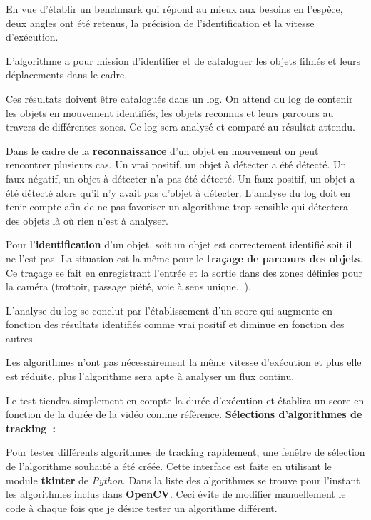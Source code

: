    En vue d'établir un benchmark qui répond au mieux aux besoins en l'espèce, deux angles ont été retenus, la précision de l'identification et la vitesse d'exécution.

    L'algorithme a pour mission d'identifier et de cataloguer les objets filmés et leurs déplacements dans le cadre.

Ces résultats doivent être catalogués dans un log. On attend du log de contenir les objets en mouvement identifiés, les objets reconnus et leurs parcours au travers de différentes zones. Ce log sera analysé et comparé au résultat attendu.

Dans le cadre de la \textbf{reconnaissance} d'un objet en mouvement on peut rencontrer plusieurs cas. Un vrai positif, un objet à détecter a été détecté. Un faux négatif, un objet à détecter n'a pas été détecté. Un faux positif, un objet a été détecté alors qu'il n'y avait pas d'objet à détecter. L'analyse du log doit en tenir compte afin de ne pas favoriser un algorithme trop sensible qui détectera des objets là où rien n'est à analyser.

Pour l'\textbf{identification} d'un objet, soit un objet est correctement identifié soit il ne l'est pas. La situation est la même pour le \textbf{traçage de parcours des objets}. Ce traçage se fait en enregistrant l'entrée et la sortie dans des zones définies pour la caméra (trottoir, passage piété, voie à sens unique...).

L'analyse du log se conclut par l'établissement d'un score qui augmente en fonction des résultats identifiés comme vrai positif  et diminue en fonction des autres.

    Les algorithmes n'ont pas nécessairement la même vitesse d'exécution et plus elle est réduite, plus l'algorithme sera apte à analyser un flux continu.
    
    Le test tiendra simplement en compte la durée d'exécution et établira un score en fonction de la durée de la vidéo comme référence.
\textbf{Sélections d'algorithmes de tracking~:}
        
Pour tester différents algorithmes de tracking rapidement,  une fenêtre de sélection de l'algorithme souhaité a été créée. Cette interface est faite en utilisant le module \textbf{tkinter} de \textit{Python}. Dans la liste des algorithmes se trouve pour l'instant les algorithmes inclus dans \textbf{OpenCV}. Ceci évite de modifier manuellement le code à chaque fois que je désire tester un algorithme différent.

